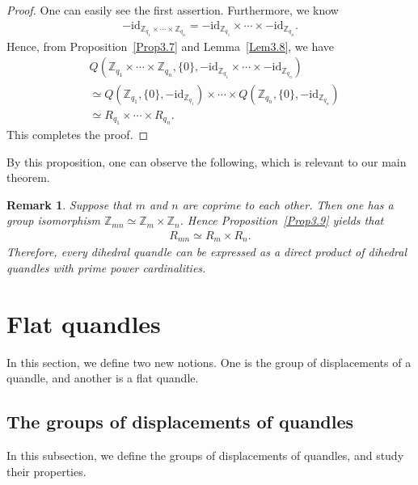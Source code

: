 \documentclass[12pt]{amsart}
\newtheorem{Rem}[Prop]{Remark}
\theoremstyle{definition}
\begin{document}
\begin{proof}
One can easily see the first assertion. Furthermore, we know
\begin{align*}
-{\mathrm{id}}_{{{\mathbb Z}}_{q_{1}} \times \cdots \times {{\mathbb Z}}_{q_{n}}} = -{\mathrm{id}}_{{{\mathbb Z}}_{q_{1}}} \times \cdots \times -{\mathrm{id}}_{{{\mathbb Z}}_{q_{n}}}.
\end{align*}
Hence, from Proposition~\ref{Prop3.7} and Lemma~\ref{Lem3.8}, we have
\begin{align*}
&Q({{\mathbb Z}}_{q_{1}} \times \cdots \times {{\mathbb Z}}_{q_{n}}, \{ 0 \}, -{\mathrm{id}}_{{{\mathbb Z}}_{q_{1}}} \times \cdots \times -{\mathrm{id}}_{{{\mathbb Z}}_{q_{n}}})\\
&\simeq Q({{\mathbb Z}}_{q_{1}}, \{ 0 \}, -{\mathrm{id}}_{{{\mathbb Z}}_{q_{1}}}) \times \cdots \times Q({{\mathbb Z}}_{q_{n}}, \{ 0 \}, -{\mathrm{id}}_{{{\mathbb Z}}_{q_{n}}})\\
&\simeq R_{q_{1}} \times \cdots \times R_{q_{n}}.
\end{align*}
This completes the proof.
\end{proof}

By this proposition, one can observe the following, which is relevant to our main theorem.

\begin{Rem}
Suppose that $ m $ and $ n $ are coprime to each other. Then one has a group isomorphism $ {{\mathbb Z}}_{mn} \simeq {{\mathbb Z}}_{m} \times {{\mathbb Z}}_{n} $. Hence Proposition~\ref{Prop3.9} yields that
\begin{align*}
R_{mn} \simeq R_{m} \times R_{n}.
\end{align*}
Therefore, every dihedral quandle can be expressed as a direct product of dihedral quandles with prime power cardinalities.
\end{Rem}

\section{Flat quandles}\label{sec4}

In this section, we define two new notions. One is the group of displacements of a quandle, and another is a flat quandle.

\subsection{The groups of displacements of quandles}

In this subsection, we define the groups of displacements of quandles, and study their properties.
\end{document}
